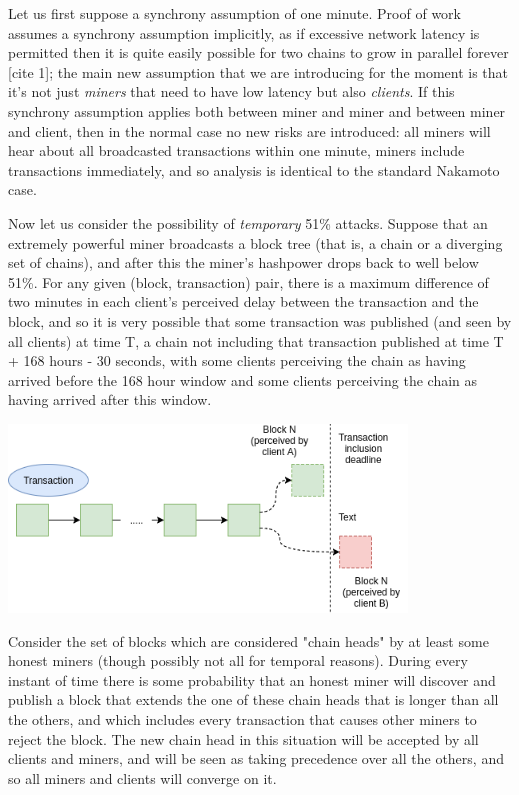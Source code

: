 \documentclass[12pt]{article}
\begin{document}
Let us first suppose a synchrony assumption of one minute. Proof of work assumes a synchrony assumption implicitly, as if excessive network latency is permitted then it is quite easily possible for two chains to grow in parallel forever [cite 1]; the main new assumption that we are introducing for the moment is that it's not just \textit{miners} that need to have low latency but also \textit{clients}. If this synchrony assumption applies both between miner and miner and between miner and client, then in the normal case no new risks are introduced: all miners will hear about all broadcasted transactions within one minute, miners include transactions immediately, and so analysis is identical to the standard Nakamoto case.

Now let us consider the possibility of \textit{temporary} 51\% attacks. Suppose that an extremely powerful miner broadcasts a block tree (that is, a chain or a diverging set of chains), and after this the miner's hashpower drops back to well below 51\%. For any given (block, transaction) pair, there is a maximum difference of two minutes in each client's perceived delay between the transaction and the block, and so it is very possible that some transaction was published (and seen by all clients) at time T, a chain not including that transaction published at time T + 168 hours - 30 seconds, with some clients perceiving the chain as having arrived before the 168 hour window and some clients perceiving the chain as having arrived after this window.

\includegraphics[width=400px]{Censorship4.png}

Consider the set of blocks which are considered "chain heads" by at least some honest miners (though possibly not all for temporal reasons). During every instant of time there is some probability that an honest miner will discover and publish a block that extends the one of these chain heads that is longer than all the others, and which includes every transaction that causes other miners to reject the block. The new chain head in this situation will be accepted by all clients and miners, and will be seen as taking precedence over all the others, and so all miners and clients will converge on it.
\end{document}
